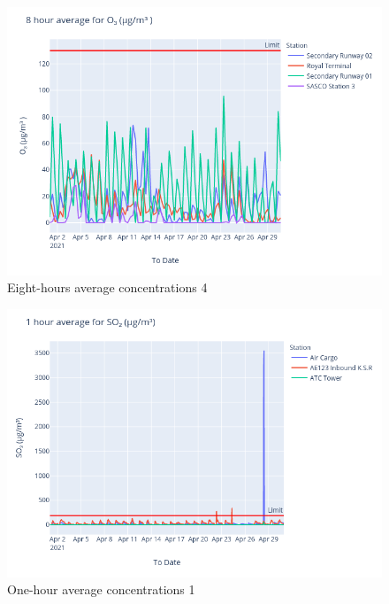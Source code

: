 \documentclass[12pt, oneside]{book}
\begin{document}
{
{\begin{figure}[H]
\centering
\includegraphics[width=\textwidth]{image220}
\caption{Eight-hours average  concentrations 4}\label{image220}
\end{figure}}{}

{\begin{figure}[H]
\centering
\includegraphics[width=\textwidth]{image185}
\caption{One-hour average  concentrations 1}\label{image185}
\end{figure}}{}

}
\end{document}
